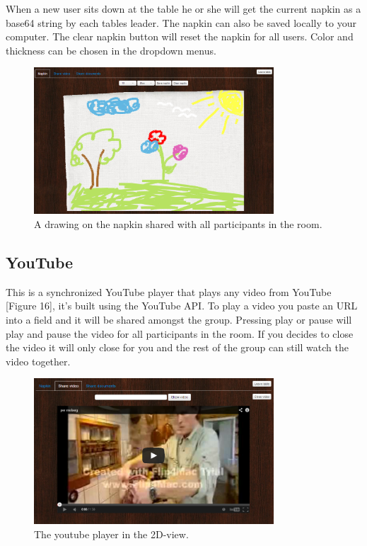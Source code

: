 \documentclass[12pt, titlepage]{article}
\begin{document}
When a new user sits down at the table he or she will get the current napkin as a base64 string by each tables leader. The napkin can also be saved locally to your computer. The clear napkin button will reset the napkin for all users. Color and thickness can be chosen in the dropdown menus.
\begin{figure}[H]
  \centering
	\includegraphics[width=0.8\textwidth,keepaspectratio]{theNapkin.png}
  \caption{A drawing on the napkin shared with all participants in the room.}
\end{figure}
\subsection{YouTube}
This is a synchronized YouTube player that plays any video from YouTube [Figure 16], it's built using the YouTube API. To play a video you paste an URL into a field and it will be shared amongst the group. Pressing play or pause will play and pause the video for all participants in the room. If you decides to close the video it will only close for you and the rest of the group can still watch the video together.
\begin{figure}[H]
  \centering
	\includegraphics[width=0.8\textwidth,keepaspectratio]{youtubeToReport.png}
  \caption{The youtube player in the 2D-view.}
\end{figure}
\end{document}
